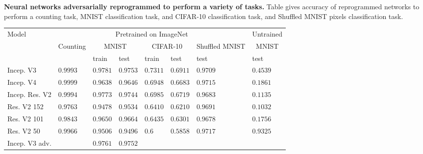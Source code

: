 \documentclass{article}
\begin{document}
  \caption{{\bf Neural networks adversarially reprogrammed to perform a variety of tasks.}
  Table gives accuracy of reprogrammed networks to perform a counting task, MNIST classification task, and CIFAR-10 classification task, and Shuffled MNIST pixels classification task.}
  \label{table: reprogramming results}
  \centering
  \begin{tabular}{llllllll}
    \toprule
       Model &  \multicolumn{6}{c}{Pretrained on ImageNet}   & \multicolumn{1}{c}{Untrained}       \\
        \cmidrule(r){2-7}
        \cmidrule(r){8-8}

   &Counting &  \multicolumn{2}{c}{MNIST}     &       \multicolumn{2}{c}{CIFAR-10}     & \multicolumn{1}{c}{Shuffled MNIST}  & \multicolumn{1}{c}{MNIST}       \\
        \cmidrule(r){3-4}
        \cmidrule(r){5-6}
        \cmidrule(r){7-7}
        \cmidrule(r){8-8}

           &  & train &  test & train & test  &test  &test  \\
    \midrule
    Incep. V3                 &  $0.9993$  &   $0.9781$    & $0.9753$    & $0.7311$  & $0.6911$  & $0.9709$ & $0.4539$  \\
    Incep. V4                 & $0.9999$   &    $0.9638$  & $0.9646$   &  $0.6948$   & $0.6683$& $0.9715$ & $0.1861$  \\
    Incep. Res. V2    & $0.9994$   &   $0.9773$  & $0.9744$    &  $0.6985$ & $0.6719$ & $0.9683$ & $0.1135$  \\
    Res. V2 152             &  $0.9763$  &    $0.9478$ &$0.9534$   &  $0.6410$ & $0.6210$ & $0.9691$ & $0.1032$ \\
    Res. V2 101             &  $0.9843$  &  $0.9650$  & $0.9664$  & $0.6435$  & $0.6301$ & $0.9678$ & $0.1756$ \\
    Res. V2 50             &  $0.9966$  &  $0.9506$  & $0.9496$  & $0.6$  & $0.5858$ & $0.9717$ &  $0.9325$ \\
    Incep. V3 adv.          &     &   $0.9761$    & $0.9752$    &   &  & & \\
    \bottomrule
  \end{tabular}
\end{document}
